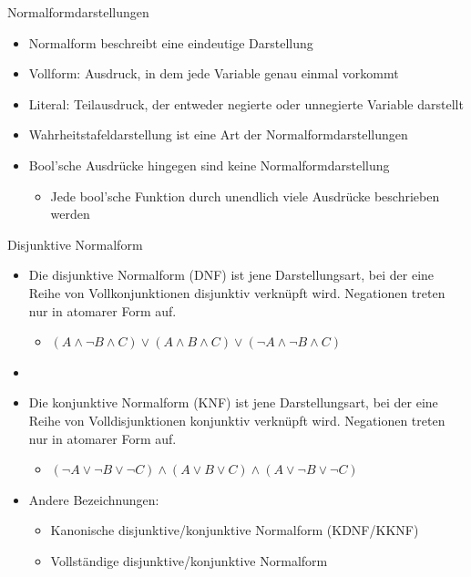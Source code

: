 \documentclass[12pt%
,aspectratio=169%
]{beamer}
\begin{document}
\begin{frame}{Normalformdarstellungen}
\begin{itemize}
	\item Normalform beschreibt eine eindeutige Darstellung
	\item Vollform: Ausdruck, in dem jede Variable genau einmal vorkommt 
	\item Literal: Teilausdruck, der entweder negierte oder unnegierte Variable darstellt
	\item Wahrheitstafeldarstellung ist eine Art der Normalformdarstellungen
	\item Bool'sche Ausdrücke hingegen sind keine Normalformdarstellung
	\begin{itemize}
		\item Jede bool'sche Funktion durch unendlich viele Ausdrücke beschrieben werden
	\end{itemize}
\end{itemize}
\end{frame}

\begin{frame}{Disjunktive Normalform}
\begin{itemize}
	\item Die disjunktive Normalform (DNF) ist jene Darstellungsart, bei der eine Reihe von Vollkonjunktionen disjunktiv verknüpft wird. Negationen  treten nur in atomarer Form auf.
	\begin{itemize}
		\item $(A \land \neg B \land C) \lor (A \land B \land C) \lor (\neg A \land \neg B \land C)$ 
	\end{itemize}
	\item \item Die konjunktive Normalform (KNF) ist jene Darstellungsart, bei der eine Reihe von Volldisjunktionen konjunktiv verknüpft wird. Negationen treten nur in atomarer Form auf.
	\begin{itemize}
		\item $(\neg A \lor \neg B \lor \neg C) \land (A \lor B \lor C) \land (A \lor \neg B \lor \neg C)$ 
	\end{itemize}
	\item Andere Bezeichnungen:
	\begin{itemize}
		\item Kanonische disjunktive/konjunktive Normalform (KDNF/KKNF)
		\item Vollständige disjunktive/konjunktive Normalform
	\end{itemize}
\end{itemize}
\end{frame}
\end{document}
